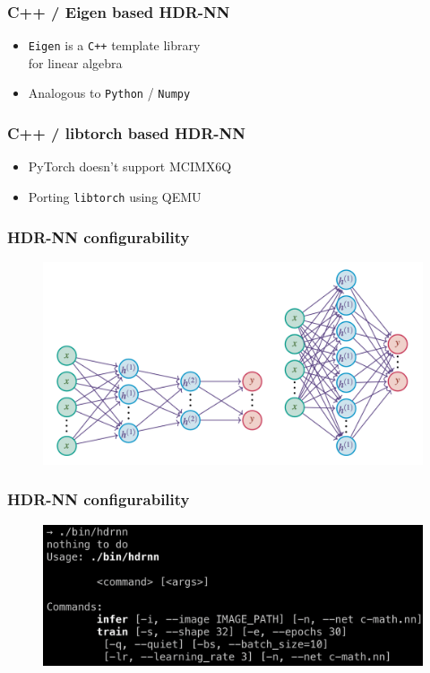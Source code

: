 \documentclass{beamer}
\begin{document}
\begin{frame}
  \frametitle{C++ / Eigen based HDR-NN}

  \begin{itemize}
    \item \texttt{Eigen} is a \texttt{C++} template library \\ for linear algebra
    \item Analogous to \texttt{Python} / \texttt{Numpy}
  \end{itemize}

\end{frame}

\begin{frame}
  \frametitle{C++ / libtorch  based HDR-NN}

  \begin{itemize}
    \item PyTorch doesn't support MCIMX6Q
    \item Porting \texttt{libtorch} using QEMU
  \end{itemize}

\end{frame}

\begin{frame}
  \frametitle{HDR-NN configurability}

  \begin{figure}
    \centering
    \includegraphics[scale=0.37]{images/networks.png}
  \end{figure}

\end{frame}

\begin{frame}
  \frametitle{HDR-NN configurability}

  \begin{figure}
    \centering
    \includegraphics[scale=0.42]{images/usage.png}
  \end{figure}

\end{frame}
\end{document}
